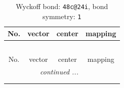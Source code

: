 \documentclass[fleqn,8pt]{jsarticle}
\begin{document}
\renewcommand{\arraystretch}{1.2}
\begin{longtable}{cccc}
\caption{Wyckoff bond: {\tt 48c@24i}, bond symmetry: {\tt 1}}
 \\
 \hline \hline
No. & vector & center & mapping \\ \hline \endfirsthead

\multicolumn{3}{l}{\tablename\ \thetable{}} \\
 \hline \hline
No. & vector & center & mapping \\ \hline \endhead

 \hline \hline
\multicolumn{3}{r}{\footnotesize\it continued ...} \\ \endfoot

 \hline \hline
\multicolumn{3}{r}{} \\ \endlastfoot


\end{longtable}
\end{document}
